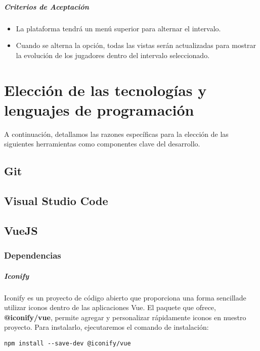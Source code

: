 \subparagraph{Criterios de Aceptación}
\begin{itemize}
    \item La plataforma tendrá un menú superior para alternar el intervalo.
    \item Cuando se alterna la opción, todas las vistas serán actualizadas para mostrar la evolución de los jugadores dentro del intervalo seleccionado.
\end{itemize}


\section{Elección de las tecnologías y lenguajes de programación}
A continuación, detallamos las razones específicas para la elección de las siguientes herramientas como componentes clave del desarrollo.

\subsection{Git}

\subsection{Visual Studio Code}


\subsection{VueJS}

\subsubsection{Dependencias}
\subparagraph{Iconify}

Iconify es un proyecto de código abierto que proporciona una forma sencillade utilizar iconos dentro de las aplicaciones Vue. El paquete que ofrece, \textbf{@iconify/vue}, permite agregar y personalizar rápidamente iconos en nuestro proyecto. Para instalarlo, ejecutaremos el comando de instalación:

\begin{lstlisting}[style=Consola, caption={Instalación del paquete iconify},label=Consola_code]
	npm install --save-dev @iconify/vue
\end{lstlisting}

